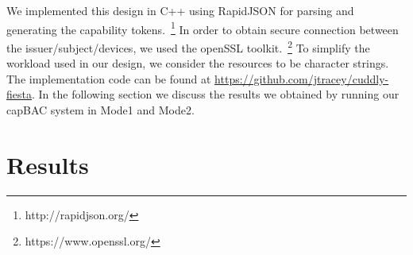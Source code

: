 We implemented this design in C++ using RapidJSON for parsing and generating the capability tokens.~\footnote{http://rapidjson.org/} In order to obtain secure connection between the issuer/subject/devices, we used the openSSL toolkit.~\footnote{https://www.openssl.org/} To simplify the workload used in our design, we consider the resources to be character strings. The implementation code can be found at \href{https://github.com/jtracey/cuddly-fiesta}{https://github.com/jtracey/cuddly-fiesta}. In the following section we discuss the results we obtained by running our capBAC system in Mode1 and Mode2.
\section{Results}
\label{sec:results}

